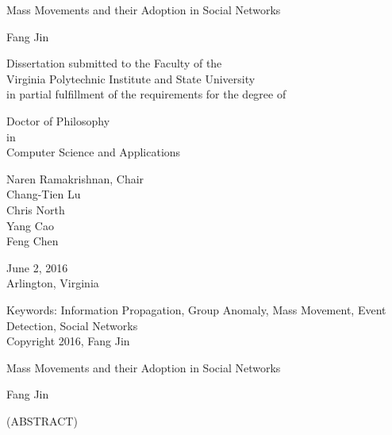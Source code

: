 \documentclass[12pt,dvips]{report}
\begin{document}
\thispagestyle{empty}
\begin{center}

{\Large
Mass Movements and their Adoption in Social Networks
}


\vfill

Fang Jin

\vfill

Dissertation submitted to the Faculty of the \\
Virginia Polytechnic Institute and State University \\
in partial fulfillment of the requirements for the degree of

\vfill

Doctor of Philosophy \\
in \\
Computer Science and Applications

\vfill

Naren Ramakrishnan, Chair \\
Chang-Tien Lu \\
Chris North \\
Yang Cao \\
Feng Chen

\vfill

June 2, 2016\\
Arlington, Virginia

\vfill

Keywords: Information Propagation, Group Anomaly, Mass Movement, Event Detection, Social Networks
\\
Copyright 2016, Fang Jin

\end{center}

\pagebreak

\thispagestyle{empty}
\begin{center}

{\large
Mass Movements and their Adoption in Social Networks
}

\vfill

Fang Jin

\vfill

(ABSTRACT)
\vfill

\end{center}
\end{document}

